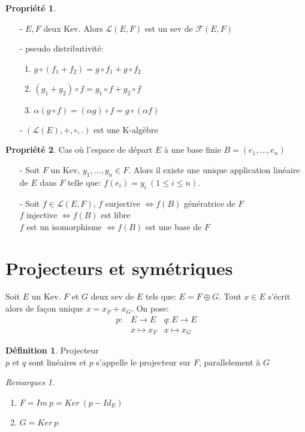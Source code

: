 \documentclass[fleqn]{article}
\theoremstyle{definition} \newtheorem*{defi}{D\'efinition}
\theoremstyle{definition} \newtheorem*{theo}{Th\'eor\`eme}
\theoremstyle{definition} \newtheorem*{coro}{Corollaire}
\theoremstyle{definition} \newtheorem*{nota}{Notation}
\theoremstyle{remark} \newtheorem*{rqs}{Remarques}
\theoremstyle{definition} \newtheorem*{prop}{Propri\'et\'e}
\begin{document}
\begin{prop} $ $
	\begin{itemize}
		\item [-] $E,F$ deux Kev. Alors $\mathscr{L}(E,F)$ est un sev de $\mathscr{F}(E,F)$
		\item [-] pseudo distributivit\'e:
			\begin{enumerate}
				\item $g \circ (f_1 + f_2) = g \circ f_1 + g \circ f_2$
				\item $(g_1 + g_2) \circ f = g_1 \circ f + g_2 \circ f$
				\item $\alpha (g \circ f) = (\alpha g) \circ f = g \circ (\alpha f)$
			\end{enumerate}
		\item [-] $(\mathscr{L}(E), +, \circ, .)$ est une K-alg\`ebre
	\end{itemize}
\end{prop}

\pagebreak
\begin{prop} Cas o\`u l'espace de d\'epart $E$ \`a une base finie $B=(e_1, \hdots, e_n)$
	\begin{itemize}
		\item [-] Soit $F$ un Kev, $y_1, \hdots, y_n \in F$. Alors il existe
			une unique application lin\'eaire de $E$ dans $F$ telle que: $f(e_i) = y_i\ (1 \leq i \leq n)$.
		\item [-] Soit $f \in \mathscr{L}(E,F)$,
			$f$ surjective $\Leftrightarrow f(B)$ g\'en\'eratrice de $F$\\
			$f$ injective $\Leftrightarrow f(B)$ est libre\\
			$f$ est un isomorphisme $\Leftrightarrow f(B)$ est une base de $F$
	\end{itemize}
\end{prop}

\section{Projecteurs et sym\'etriques}
Soit $E$ un Kev. $F$ et $G$ deux sev de $E$ tels que: $E = F \oplus G$. Tout $x \in E$ s'\'ecrit alors de fa\c{c}on unique $x = x_F + x_G$. On pose:
\begin{align*} p: &E \rightarrow E  &q: E \rightarrow E\\
			      &x \mapsto x_F &x \mapsto x_G
\end{align*}
\begin{defi} Projecteur \\
	$p$ et $q$ sont lin\'eaires et $p$ s'appelle le projecteur sur $F$, parallelement \`a $G$

	\begin{rqs} $ $
		\begin{enumerate}
			\item $F = Im\ p = Ker\ (p - Id_E)$
			\item $G = Ker\ p$
		\end{enumerate}
	\end{rqs}
\end{defi}
\end{document}
